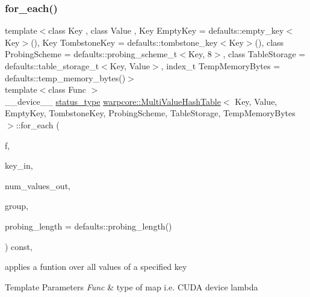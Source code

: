 \subsubsection{\texorpdfstring{for\+\_\+each()}{for\_each()}\hspace{0.1cm}{\footnotesize\ttfamily [1/3]}}
{\footnotesize\ttfamily template$<$class Key , class Value , Key Empty\+Key = defaults\+::empty\+\_\+key$<$\+Key$>$(), Key Tombstone\+Key = defaults\+::tombstone\+\_\+key$<$\+Key$>$(), class Probing\+Scheme  = defaults\+::probing\+\_\+scheme\+\_\+t$<$\+Key, 8$>$, class Table\+Storage  = defaults\+::table\+\_\+storage\+\_\+t$<$\+Key, Value$>$, index\+\_\+t Temp\+Memory\+Bytes = defaults\+::temp\+\_\+memory\+\_\+bytes()$>$ \\
template$<$class Func $>$ \\
\+\_\+\+\_\+device\+\_\+\+\_\+ \hyperlink{classwarpcore_1_1Status}{status\+\_\+type} \hyperlink{classwarpcore_1_1MultiValueHashTable}{warpcore\+::\+Multi\+Value\+Hash\+Table}$<$ Key, Value, Empty\+Key, Tombstone\+Key, Probing\+Scheme, Table\+Storage, Temp\+Memory\+Bytes $>$\+::for\+\_\+each (\begin{DoxyParamCaption}\item[{Func}]{f,  }\item[{const key\+\_\+type}]{key\+\_\+in,  }\item[{index\+\_\+type \&}]{num\+\_\+values\+\_\+out,  }\item[{const cg\+::thread\+\_\+block\+\_\+tile$<$ \hyperlink{classwarpcore_1_1MultiValueHashTable_ad300c5a01bd933343ff08176fb4b4e29}{cg\+\_\+size}()$>$ \&}]{group,  }\item[{const index\+\_\+type}]{probing\+\_\+length = {\ttfamily defaults\+:\+:probing\+\_\+length()} }\end{DoxyParamCaption}) const\hspace{0.3cm}{\ttfamily [inline]}, {\ttfamily [noexcept]}}



applies a funtion over all values of a specified key 


\begin{DoxyTemplParams}{Template Parameters}
{\em Func} & type of map i.\+e. C\+U\+DA device lambda \\
\hline
\end{DoxyTemplParams}

